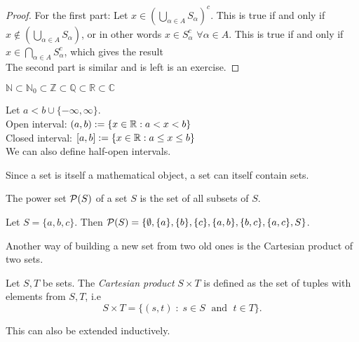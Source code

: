 \documentclass{article}
\begin{document}
\begin{proof}
For the first part: Let $x \in \left( \bigcup_{\alpha \in A} S_\alpha \right)^c$. This is true if and only if $x \notin \left( \bigcup_{\alpha \in A} S_\alpha \right)$, or in other words $x \in S_\alpha^c$ $\forall \alpha \in A$. This is true if and only if $x \in \bigcap_{\alpha \in A} S_\alpha^c$, which gives the result \\
The second part is similar and is left is an exercise. 
\end{proof}


\begin{example}
$\mathbb{N} \subset \mathbb{N}_0 \subset \mathbb{Z} \subset \mathbb{Q} \subset \mathbb{R} \subset \mathbb{C}$
\end{example}

\begin{example} Let $a < b \cup \{-\infty, \infty \}$. \\
Open interval: $(a,b) := \{x \in {\mathbb{R}} : a < x < b \}$ \\
Closed interval: $[a,b] := \{x \in {\mathbb{R}} : a \leq x \leq b \}$ \\
We can also define half-open intervals. 
\end{example}


Since a set is itself a mathematical object, a set can itself contain sets.
\begin{definition}
The power set $\mathcal{P}(S)$ of a set $S$ is the set of all subsets of $S$.
\end{definition}

\begin{example}
Let $S = \{a,b,c\}$. Then $\mathcal{P}(S) = \{ \emptyset, \{a\}, \{b\}, \{c\}, \{a,b\},\{b,c\}, \{a,c\}, S \}$. 
\end{example}

Another way of building a new set from two old ones is the Cartesian product of two sets.

\begin{definition}\label{def:cartes_prod}
Let $S,T$ be sets. The \emph{Cartesian product} $S\times T$ is defined as the set of tuples with elements from $S,T$, i.e 
\begin{equation*}
    S\times T = \{ (s,t) \; \colon \; s \in S \; \text{ and } \; t \in T\}.
\end{equation*}
\end{definition}

This can also be extended inductively. 
\end{document}
